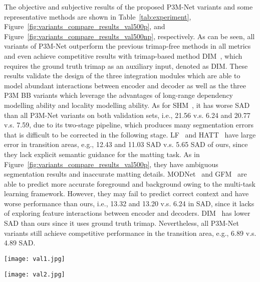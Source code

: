 \documentclass[twocolumn]{svjour3}
\begin{document}
The objective and subjective results of the proposed P3M-Net variants and some representative methods are shown in Table~\ref{tab:experiment}, Figure~\ref{fig:variants_compare_results_val500p}, and Figure~\ref{fig:variants_compare_results_val500np}, respectively. As can be seen, all variants of P3M-Net outperform the previous trimap-free methods in all metrics and even achieve competitive results with trimap-based method DIM~\citep{dim}, which requires the ground truth trimap as an auxiliary input, denoted as DIM. These results validate the design of the three integration modules which are able to model abundant interactions between encoder and decoder as well as the three P3M BB variants which leverage the advantages of long-range dependency modelling ability and locality modelling ability. As for SHM~\citep{shm}, it has worse SAD than all P3M-Net variants on both validation sets, i.e., 21.56 v.s. 6.24 and 20.77 v.s. 7.59, due to its two-stage pipeline, which produces many segmentation errors that is difficult to be corrected in the following stage. LF~\citep{lf} and HATT~\citep{hatt} have large error in transition areas, e.g., 12.43 and 11.03 SAD v.s. 5.65 SAD of ours, since they lack explicit semantic guidance for the matting task. As in Figure~\ref{fig:variants_compare_results_val500p}, they have ambiguous segmentation results and inaccurate matting details. MODNet~\citep{modnet} and GFM~\citep{gfm} are able to predict more accurate foreground and background owing to the multi-task learning framework. However, they may fail to predict correct context and have worse performance than ours, i.e., 13.32 and 13.20 v.s. 6.24 in SAD, since it lacks of exploring feature interactions between encoder and decoders. DIM~\citep{dim} has lower SAD than ours since it uses ground truth trimap. Nevertheless, all P3M-Net variants still achieve competitive performance in the transition area, e.g., 6.89 v.s. 4.89 SAD. 


\begin{figure*}[hbtp]
    \centering
    \texttt{[image: val1.jpg]}
    \caption{Visual results of SOTA methods and the proposed P3M-Net variants on P3M-500-P. Among all the methods, only DIM~\citep{dim} requires an extra trimap as input while the others are automatic methods.}
    \label{fig:variants_compare_results_val500p}
\end{figure*}

\begin{figure*}[hbtp]
    \centering
    \texttt{[image: val2.jpg]}
    \caption{Visual results of SOTA methods and the proposed P3M-Net variants on P3M-500-NP. Among all the methods, only DIM~\citep{dim} requires an extra trimap as input while the others are automatic methods.}
    \label{fig:variants_compare_results_val500np}
\end{figure*}
\end{document}
